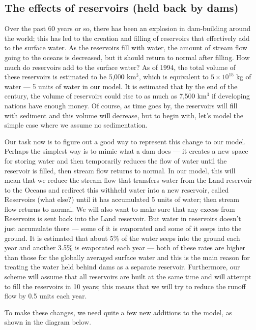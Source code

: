 \documentclass[11pt,letterpaper]{article}
\begin{document}
\subsection{The effects of reservoirs (held back by dams)}
Over the past 60 years or so, there has been an explosion in dam-building around the world; this has led to the creation and filling of reservoirs that effectively add to the surface water. As the reservoirs fill with water, the amount of stream flow going to the oceans is decreased, but it should return to normal after filling. How much do reservoirs add to the surface water? As of 1994, the total volume of these reservoirs is estimated to be 5,000 km$^3$, which is equivalent to $5\times{10}^{15}$ kg of water --- 5 units of water in our model. It is estimated that by the end of the century, the volume of reservoirs could rise to as much as 7,500 km$^3$ if developing nations have enough money. Of course, as time goes by, the reservoirs will fill with sediment and this volume will decrease, but to begin with, let's model the simple case where we assume no sedimentation.

Our task now is to figure out a good way to represent this change to our model. Perhaps the simplest way is to mimic what a dam does --- it creates a new space for storing water and then temporarily reduces the flow of water until the reservoir is filled, then stream flow returns to normal. In our model, this will mean that we reduce the stream flow that transfers water from the Land reservoir to the Oceans and redirect this withheld water into a new reservoir, called Reservoirs (what else?) until it has accumulated 5 units of water; then stream flow returns to normal. We will also want to make sure that any excess from Reservoirs is sent back into the Land reservoir. But water in reservoirs doesn't just accumulate there --- some of it is evaporated and some of it seeps into the ground. It is estimated that about 5\% of the water seeps into the ground each year and another 3.5\% is evaporated each year --- both of these rates are higher than those for the globally averaged surface water and this is the main reason for treating the water held behind dams as a separate reservoir. Furthermore, our scheme will assume that all reservoirs are built at the same time and will attempt to fill the reservoirs in 10 years; this means that we will try to reduce the runoff flow by 0.5 units each year.

To make these changes, we need quite a few new additions to the model, as shown in the diagram below.
\end{document}
